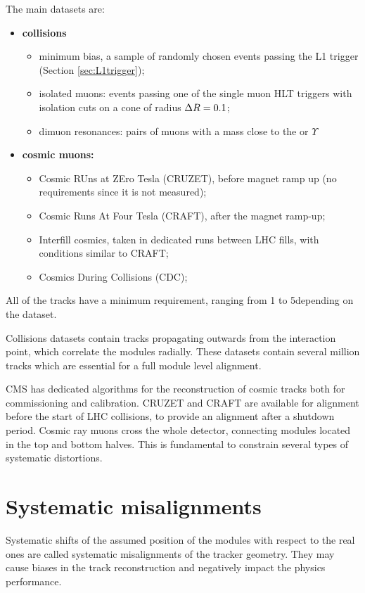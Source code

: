 The main datasets are:
\begin{itemize}
\item \textbf{collisions}
  \begin{itemize}
  \item minimum bias, a sample of randomly chosen events passing the L1 trigger (Section \ref{sec:L1trigger});
  \item isolated muons: events passing one of the single muon HLT triggers with isolation cuts on a cone of radius $\Delta R = 0.1$;
  \item dimuon resonances: pairs of muons with a mass close to the \PZ or $\Upsilon$ %
  \end{itemize}
\item \textbf{cosmic muons:}
  \begin{itemize}
  \item Cosmic RUns at ZEro Tesla (CRUZET), before magnet ramp up (no \pt requirements since it is not measured);
  \item Cosmic Runs At Four Tesla (CRAFT), after the magnet ramp-up;
  \item Interfill cosmics, taken in dedicated runs between LHC fills, with conditions similar to CRAFT;
  \item Cosmics During Collisions (CDC);
  \end{itemize}
\end{itemize}
All of the tracks have a minimum \pt requirement, ranging from 1 to 5\GeV depending on the dataset.

Collisions datasets contain tracks propagating outwards from the interaction point, which correlate the modules radially.
These datasets contain several million tracks which are essential for a full module level alignment.

CMS has dedicated algorithms for the reconstruction of cosmic tracks both for commissioning and calibration.
CRUZET and CRAFT are available for alignment before the start of LHC collisions, to provide an alignment after a shutdown period.
Cosmic ray muons cross the whole detector, connecting modules located in the top and bottom halves.
This is fundamental to constrain several types of systematic distortions.

\section{Systematic misalignments}
Systematic shifts of the assumed position of the modules with respect to the real ones
are called systematic misalignments of the tracker geometry. They
may cause biases in the track reconstruction and negatively impact the physics performance.

